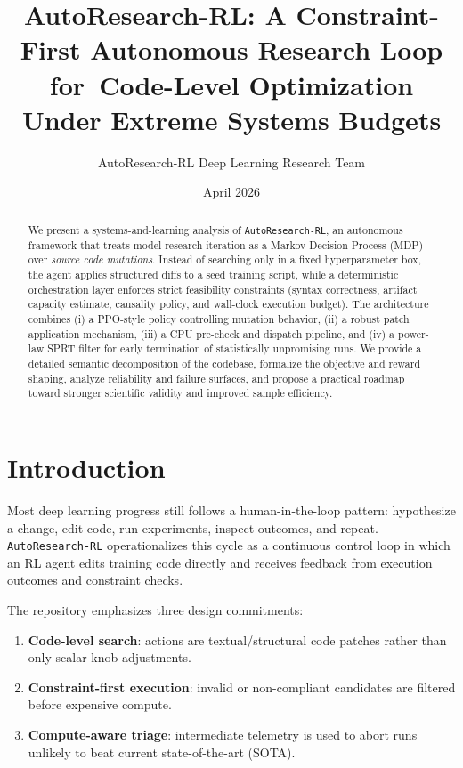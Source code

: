 \documentclass[11pt]{article}
\title{AutoResearch-RL: A Constraint-First Autonomous Research Loop for\
Code-Level Optimization Under Extreme Systems Budgets}
\author{AutoResearch-RL Deep Learning Research Team}
\date{April 2026}
\begin{document}
\maketitle

\begin{abstract}
We present a systems-and-learning analysis of \texttt{AutoResearch-RL}, an autonomous framework that treats model-research iteration as a Markov Decision Process (MDP) over \emph{source code mutations}. Instead of searching only in a fixed hyperparameter box, the agent applies structured diffs to a seed training script, while a deterministic orchestration layer enforces strict feasibility constraints (syntax correctness, artifact capacity estimate, causality policy, and wall-clock execution budget). The architecture combines (i) a PPO-style policy controlling mutation behavior, (ii) a robust patch application mechanism, (iii) a CPU pre-check and dispatch pipeline, and (iv) a power-law SPRT filter for early termination of statistically unpromising runs. We provide a detailed semantic decomposition of the codebase, formalize the objective and reward shaping, analyze reliability and failure surfaces, and propose a practical roadmap toward stronger scientific validity and improved sample efficiency.
\end{abstract}

\section{Introduction}
Most deep learning progress still follows a human-in-the-loop pattern: hypothesize a change, edit code, run experiments, inspect outcomes, and repeat. \texttt{AutoResearch-RL} operationalizes this cycle as a continuous control loop in which an RL agent edits training code directly and receives feedback from execution outcomes and constraint checks.

The repository emphasizes three design commitments:
\begin{enumerate}[leftmargin=1.5em]
    \item \textbf{Code-level search}: actions are textual/structural code patches rather than only scalar knob adjustments.
    \item \textbf{Constraint-first execution}: invalid or non-compliant candidates are filtered before expensive compute.
    \item \textbf{Compute-aware triage}: intermediate telemetry is used to abort runs unlikely to beat current state-of-the-art (SOTA).
\end{enumerate}
\end{document}
